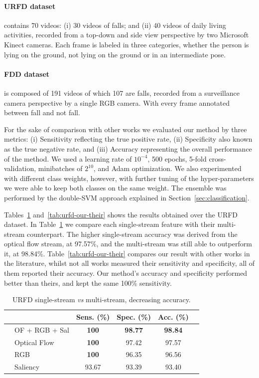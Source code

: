 \documentclass[conference]{IEEEtran}
\begin{document}
{\paragraph{URFD dataset} contains 70 videos: (i) 30 videos of falls; and (ii) 40 videos of daily living activities, recorded from a top-down and side view perspective by two Microsoft Kinect cameras. Each frame is labeled in three categories, whether the person is lying on the ground, not lying on the ground or in an intermediate pose.
\paragraph{FDD dataset} is composed of 191 videos of which 107 are falls, recorded from a surveillance camera perspective by a single RGB camera. With every frame annotated between fall and not fall.

For the sake of comparison with other works we evaluated our method by three metrics: (i) Sensitivity reflecting the true positive rate, (ii) Specificity also known as the true negative rate, and (iii) Accuracy representing the overall performance of the method. We used a learning rate of $10^{-4}$, 500 epochs, 5-fold cross-validation, minibatches of $2^{10}$, and Adam optimization. We also experimented with different class weights, however, with further tuning of the hyper-parameters we were able to keep both classes on the same weight. The ensemble was performed by the double-SVM approach explained in Section~\ref{sec:classification}.

Tables~\ref{tab:urfd-ensem} and~\ref{tab:urfd-our-their} shows the results obtained over the URFD dataset. In Table~\ref{tab:urfd-ensem} we compare each single-stream feature with their multi-stream counterpart. The higher single-stream accuracy was derived from the optical flow stream, at 97.57\%, and the multi-stream was still able to outperform it, at 98.84\%. Table~\ref{tab:urfd-our-their} compares our result with other works in the literature, whilst not all works measured their sensitivity and specificity, all of them reported their accuracy. Our method's accuracy and specificity performed better than theirs, and kept the same 100\% sensitivity.

\begin{table}[]
\centering
\caption{URFD single-stream \textit{vs} multi-stream, decreasing accuracy.}
\label{tab:urfd-ensem}
\begin{tabular}{llcccl}
\hline
 &  & Sens. (\%) & Spec. (\%) & Acc. (\%) &  \\ \hline
 & OF + RGB + Sal & \textbf{100} & \textbf{98.77} & \textbf{98.84} &  \\
 & Optical Flow & \textbf{100} & 97.42 & 97.57 &  \\
 & RGB & \textbf{100} & 96.35 & 96.56 &  \\
 & Saliency & 93.67 & 93.39 & 93.40 &  \\ \hline
\end{tabular}
\end{table}

}
\end{document}
